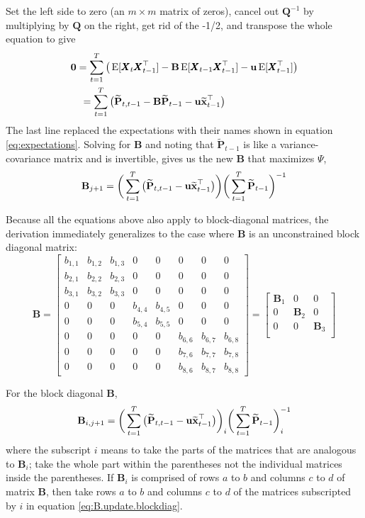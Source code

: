 \documentclass[]{article}
\def\BB{\mbox{$\mathbf B$}}	\def\bb{\mbox{$\mathbf b$}}
\def\PP{\mbox{$\mathbf P$}}  \def\pp{\mbox{$\mathbf p$}}
\def\QQ{\mbox{$\mathbf Q$}}	 \def\qq{\mbox{$\mathbf q$}}
\def\XX{\mbox{$\pmb{X}$}}	\def\xx{\mbox{$\pmb{x}$}}
\def\E{\,\textup{\textrm{E}}}
\def\hatxtm{\widetilde{\mbox{$\mathbf x$}}_{t-1}}
\def\hatPtm{\widetilde{\PP}_{t-1}}
\def\hatPttm{\widetilde{\PP}_{t,t-1}}
\begin{document}
Set the left side to zero (an $m \times m$ matrix of zeros), cancel out $\QQ^{-1}$ by multiplying by $\QQ$ on the right, get rid of the -1/2, and transpose the whole equation to give
\begin{equation}\label{eq:B.unconstrained4}
\begin{split}
&\mathbf{0}  =  \sum_{t=1}^T\big(\E[\XX_t\XX_{t-1}^\top] - \BB \E[\XX_{t-1}\XX_{t-1}^\top] - \uu \E[\XX_{t-1}^\top]\big)\\ 
&\quad =  \sum_{t=1}^T \big( \hatPttm  - \BB \hatPtm - \uu \hatxtm^\top \big)
\end{split}
\end{equation}
The last line replaced the expectations  with their names shown in  equation \ref{eq:expectations}.
Solving for $\BB$ and noting that $\hatPtm$ is like a variance-covariance matrix and is invertible, gives us the new $\BB$ that maximizes $\Psi$, 
\begin{equation}\label{eq:B.update.unconstrained}
\BB_{j+1}= \bigg( \sum_{t=1}^T \big( \hatPttm  - \uu \hatxtm^\top \big)\bigg) \bigg(\sum_{t=1}^T \hatPtm\bigg)^{-1}
\end{equation}

Because all the equations above also apply to block-diagonal matrices, the derivation immediately generalizes to the case where $\BB$ is an unconstrained block diagonal matrix:
\begin{equation*}
\BB =
\begin{bmatrix}
b_{1,1}&b_{1,2}&b_{1,3}&0&0&0&0&0\\
b_{2,1}&b_{2,2}&b_{2,3}&0&0&0&0&0\\
b_{3,1}&b_{3,2}&b_{3,3}&0&0&0&0&0\\
0&0&0&b_{4,4}&b_{4,5}&0&0&0\\
0&0&0&b_{5,4}&b_{5,5}&0&0&0\\
0&0&0&0&0&b_{6,6}&b_{6,7}&b_{6,8}\\
0&0&0&0&0&b_{7,6}&b_{7,7}&b_{7,8}\\
0&0&0&0&0&b_{8,6}&b_{8,7}&b_{8,8}
\end{bmatrix}
=
\begin{bmatrix}
\BB_1&0&0\\
0&\BB_2&0\\
0&0&\BB_3\\
\end{bmatrix}
\end{equation*} 

For the block diagonal $\BB$,
\begin{equation}\label{eq:B.update.blockdiag}
\BB_{i,j+1}= \bigg( \sum_{t=1}^T \big( \hatPttm  - \uu \hatxtm^\top \big) \bigg)_i \bigg(\sum_{t=1}^T \hatPtm \bigg)_i^{-1}
\end{equation}
where the subscript $i$ means to take the parts of the matrices that are analogous to $\BB_i$; take the whole part within the parentheses not the individual matrices inside the parentheses.  If $\BB_i$ is comprised of rows $a$ to $b$ and columns $c$ to $d$ of matrix $\BB$, then  take rows $a$ to $b$ and columns $c$ to $d$ of the matrices subscripted by $i$ in equation \ref{eq:B.update.blockdiag}.
\end{document}
